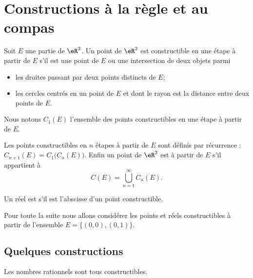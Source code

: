 \section{Constructions à la règle et au compas}

\begin{definition}
    Soit \( E\) une partie de \( \eR^2\). Un point de \( \eR^2\) est constructible en une étape à partir de \( E\) s'il est une point de \( E\) ou une intersection de deux objets parmi
    \begin{itemize}
        \item les droites passant par deux points distincts de \( E\);
        \item les cercles centrés en un point de \( E\) et dont le rayon est la distance entre deux points de \( E\).
    \end{itemize}
    Nous notons \( C_1(E)\) l'ensemble des points constructibles en une étape à partir de \( E\).

    Les points constructibles en \( n\) étapes à partir de \( E\) sont définis par récurrence : \( C_{n+1}(E)=C_1\big( C_n(E) \big)\). Enfin un point de \( \eR^2\) est  à partir de \( E\) s'il appartient à
    \begin{equation}
        C(E)=\bigcup_{n=1}^{\infty}C_n(E).
    \end{equation}

    Un réel est  s'il est l'abscisse d'un point constructible.
\end{definition}
Pour toute la suite nous allons considérer les points et réels constructibles à partir de l'ensemble \( E=\{ (0,0),(0,1) \}\).

\subsection{Quelques constructions}

\begin{proposition}  \label{PropIMFooDWAyoH}
    Les nombres rationnels sont tous constructibles.
\end{proposition}


